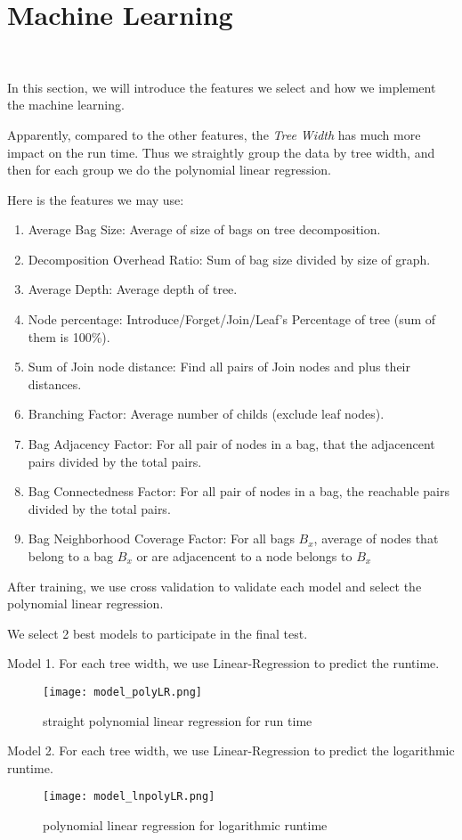 \section{Machine Learning}~\label{sec.ML}

In this section, we will introduce the features we select and how we implement the machine learning.

Apparently, compared to the other features, the \textit{Tree Width} has much more impact on the run time. Thus we straightly group the data by tree width, and then for each group we do the polynomial linear regression.

Here is the features we may use:

\begin{enumerate}
    \item Average Bag Size: Average of size of bags on tree decomposition.
    \item Decomposition Overhead Ratio: Sum of bag size divided by size of graph.
    \item Average Depth: Average depth of tree.
    \item Node percentage: Introduce/Forget/Join/Leaf's Percentage of tree (sum of them is 100\%).
    \item Sum of Join node distance: Find all pairs of Join nodes and plus their distances.
    \item Branching Factor: Average number of childs (exclude leaf nodes).
    \item Bag Adjacency Factor: For all pair of nodes in a bag, that the adjacencent pairs divided by the total pairs.
    \item Bag Connectedness Factor: For all pair of nodes in a bag, the reachable pairs divided by the total pairs.
    \item Bag Neighborhood Coverage Factor: For all bags $B_{x}$, average of nodes that belong to a bag $B_{x}$ or are adjacencent to a node belongs to $B_{x}$
\end{enumerate}

After training, we use cross validation to validate each model and select the polynomial linear regression.

We select 2 best models to participate in the final test.

Model 1. For each tree width, we use Linear-Regression to predict the runtime.

\begin{figure}[h!]
    \centering
    \texttt{[image: model\_polyLR.png]}
    \caption{straight polynomial linear regression for run time}
    \label{straight polynomial linear regression for run time}
    \end{figure}

Model 2. For each tree width, we use Linear-Regression to predict the logarithmic runtime.

\begin{figure}[h!]
    \centering
    \texttt{[image: model\_lnpolyLR.png]}
    \caption{polynomial linear regression for logarithmic runtime}
    \label{polynomial linear regression for logarithmic runtime}
    \end{figure}